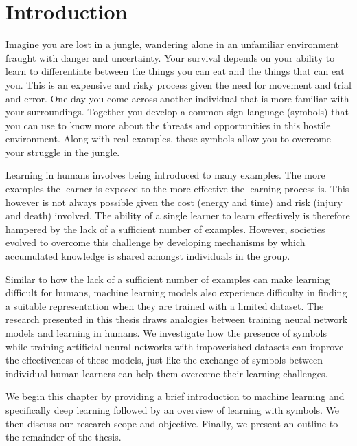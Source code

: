 \chapter{Introduction} \label{sec:introduction}

Imagine you are lost in a jungle, wandering alone in an unfamiliar environment fraught with danger and uncertainty. Your survival depends on your ability to learn to differentiate between the things you can eat and the things that can eat you. This is an expensive and risky process given the need for movement and trial and error. One day you come across another individual that is more familiar with your surroundings. Together you develop a common sign language (symbols) that you can use to know more about the threats and opportunities in this hostile environment. Along with real examples, these symbols allow you to overcome your struggle in the jungle.

Learning in humans involves being introduced to many examples. The more examples the learner is exposed to the more effective the learning process is. This however is not always possible given the cost (energy and time) and risk (injury and death) involved. The ability of a single learner to learn effectively is therefore hampered by the lack of a sufficient number of examples. However, societies evolved to overcome this challenge by developing mechanisms by which accumulated knowledge is shared amongst individuals in the group\cite{DBLP:journals/corr/abs-1203-2990}.

Similar to how the lack of a sufficient number of examples can make learning difficult for humans, machine learning models also experience difficulty in finding a suitable representation when they are trained with a limited dataset. The research presented in this thesis draws analogies between training neural network models and learning in humans.  We investigate how the presence of symbols while training artificial neural networks with impoverished datasets can improve the effectiveness of these models, just like the exchange of symbols between individual human learners can help them overcome their learning challenges.

We begin this chapter by providing a brief introduction to machine learning and specifically deep learning followed by an overview of learning with symbols. We then discuss our research scope and objective. Finally, we present an outline to the remainder of the thesis.








